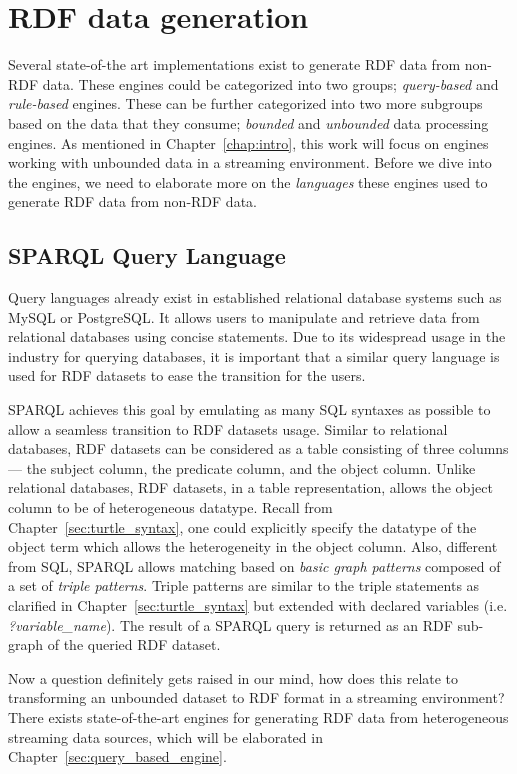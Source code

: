 \chapter{RDF data generation}
Several state-of-the art implementations exist to generate RDF data from 
non-RDF data. These engines could be categorized into two groups; \emph{query-based} and 
\emph{rule-based} engines. These can be further categorized into two more subgroups 
based on the data that they consume; \emph{bounded} and \emph{unbounded} data processing 
engines. As mentioned in Chapter~\ref{chap:intro}, this work will focus on 
engines working with unbounded data in a streaming environment. Before we dive into 
the engines, we need to elaborate more on the \emph{languages} these engines used 
to generate RDF data from non-RDF data. 


\section{SPARQL Query Language}
Query languages already exist in established relational database systems such as 
MySQL or PostgreSQL. It allows users to manipulate and retrieve data 
from relational databases using concise statements. Due to its widespread 
usage in the industry for querying databases, it is important that a similar 
query language is used for RDF datasets to ease the transition for the users. 

SPARQL\cite{sparql} achieves this goal by emulating as many SQL syntaxes as possible to allow 
a seamless transition to RDF datasets usage. Similar to relational databases, RDF 
datasets can be considered as a table consisting of three columns --- the subject column, 
the predicate column, and the object column. Unlike relational databases, 
RDF datasets, in a table representation, allows the object column to be of heterogeneous datatype. 
Recall from Chapter~\ref{sec:turtle_syntax}, one could explicitly specify the 
datatype of the object term which allows the heterogeneity in the object column.  
Also, different from SQL, SPARQL allows matching based on \emph{basic graph patterns} composed 
of a set of \emph{triple patterns}. Triple patterns are similar to the triple statements 
as clarified in Chapter~\ref{sec:turtle_syntax} but extended with declared variables (i.e. \emph{?variable\_name}). 
The result of a SPARQL query is returned as an RDF sub-graph of the queried RDF dataset. 

Now a question definitely gets raised in our mind, how does this relate to transforming an 
unbounded dataset to RDF format in a streaming environment? There exists state-of-the-art 
engines for generating RDF data from heterogeneous streaming data sources, which will be 
elaborated in Chapter~\ref{sec:query_based_engine}. 

